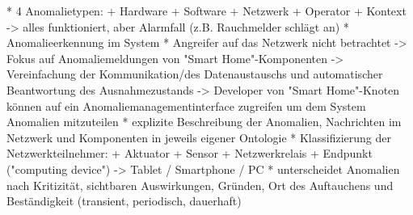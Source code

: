 	* 4 Anomalietypen:
		+ Hardware
		+ Software
		+ Netzwerk
		+ Operator
		+ Kontext -> alles funktioniert, aber Alarmfall (z.B. Rauchmelder schlägt an)
	* Anomalieerkennung im System
	* Angreifer auf das Netzwerk nicht betrachtet -> Fokus auf Anomaliemeldungen von "Smart Home"-Komponenten -> Vereinfachung der Kommunikation/des Datenaustauschs und automatischer Beantwortung des Ausnahmezustands -> Developer von "Smart Home"-Knoten können auf ein Anomaliemanagementinterface zugreifen um dem System Anomalien mitzuteilen
	* explizite Beschreibung der Anomalien, Nachrichten im Netzwerk und Komponenten in jeweils eigener Ontologie
	* Klassifizierung der Netzwerkteilnehmer:
		+ Aktuator
		+ Sensor
		+ Netzwerkrelais
		+ Endpunkt ("computing device") -> Tablet / Smartphone / PC
	* unterscheidet Anomalien nach Kritizität, sichtbaren Auswirkungen, Gründen, Ort des Auftauchens und Beständigkeit (transient, periodisch, dauerhaft)
